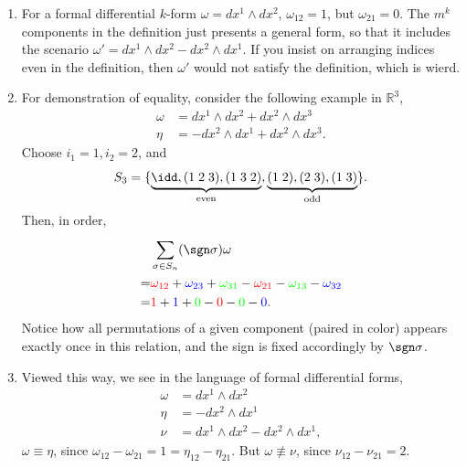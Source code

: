 \documentclass[../main.tex]{subfiles}
\begin{document}
    \begin{remark}
        \begin{enumerate}
            \item For a formal differential \(k\)-form \(\omega = dx^1\wedge dx^2\), 
            \(\omega_{12} = 1\), but \(\omega_{21} = 0\). The \(m^k\) components in 
            the definition just presents a general form, so that it includes the 
            scenario \(\omega' = dx^1\wedge dx^2 - dx^2 \wedge dx^1\). If you insist 
            on arranging indices even in the definition, then \(\omega'\) would not 
            satisfy the definition, which is wierd.
            \item For demonstration of equality, consider the following example in 
            \(\mathbb{R}^3\),
            \[
            \begin{aligned}
                \omega &= dx^1\wedge dx^2 + dx^2\wedge dx^3 \\
                \eta   &= -dx^2 \wedge dx^1 + dx^2 \wedge dx^3.
            \end{aligned}
            \]
            Choose \(i_1 = 1, i_2 = 2\), and 
            \[
            S_3 = \{\underbrace{\idd, (1\;2\;3), (1\;3\;2)}_{\text{even}}
            , \underbrace{(1\;2), (2\;3), (1\;3)}_{\text{odd}}\}.
            \]
            Then, in order, 
            \[
            \begin{aligned}
                &\sum_{\sigma \in S_n}^{} (\sgn \sigma)\omega \\
                =&\textcolor{red}{\omega_{12}}+\textcolor{blue}{\omega_{23}}
                +\textcolor{green}{\omega_{31}}-\textcolor{red}{\omega_{21}}
                -\textcolor{green}{\omega_{13}}-\textcolor{blue}{\omega_{32}} \\
                =&\textcolor{red}{1}+\textcolor{blue}{1}
                +\textcolor{green}{0}-\textcolor{red}{0}
                -\textcolor{green}{0}-\textcolor{blue}{0}.
            \end{aligned}
            \]
            Notice how all permutations of a given component (paired in color) 
            appears exactly once in this relation, and the sign is fixed 
            accordingly by \(\sgn \sigma\).
            \item Viewed this way, we see in the language of formal differential 
            forms, 
            \[
            \begin{aligned}
                \omega &= dx^1\wedge dx^2 \\
                \eta &= -dx^2\wedge dx^1 \\
                \nu &= dx^1\wedge dx^2 - dx^2\wedge dx^1,
            \end{aligned}
            \]
            \(\omega \equiv \eta\), since \(\omega_{12} - \omega_{21} = 1 = 
            \eta_{12} - \eta_{21}\). But \(\omega \not\equiv \nu\), since 
            \(\nu_{12} - \nu_{21} = 2\).
        \end{enumerate}
    \end{remark}
\end{document}

